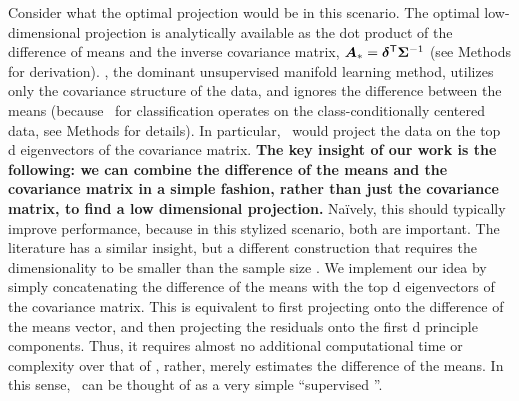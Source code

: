 \documentclass[10pt]{article}
\begin{document}
Consider what the optimal projection would be in this scenario. The optimal low-dimensional projection is analytically available as the dot product of the difference of means and the inverse covariance matrix, $\boldsymbol{A}_*=\boldsymbol{\delta}^{\mathsf{T}} \boldsymbol{\Sigma}^{-1}$ \cite{Bickel2004a} (see Methods for derivation).
\Pca, the dominant unsupervised manifold learning method, utilizes only the covariance structure of the data, and ignores the difference between the means (because \Pca~for classification operates on the class-conditionally centered data, see Methods for details).
In particular, \Pca~would project the data on the top d eigenvectors of the  covariance matrix.
\textbf{The key insight of our work is the following: we can combine the difference of the means and the covariance matrix in a simple fashion, rather than just the covariance matrix, to find a low dimensional projection.}
Na\"ively, this should typically improve performance, because in this stylized scenario, both are important. The  literature has a similar insight, but a different construction that requires the dimensionality to be smaller than the sample size \cite{Li1991a, Tishby1999a, Globerson2003a, Cook2005a,Fukumizu2004a}. We implement our idea by simply concatenating the difference of the means with the top d eigenvectors of the  covariance matrix.
This is equivalent to first projecting onto the difference of the means vector, and then projecting the residuals onto the first d principle components.
Thus, it requires almost no additional computational time or complexity over that of \Pca, rather, merely estimates the difference of the means.
In this sense, \Lol~can be thought of as a very simple  ``supervised \Pca''.
\end{document}
